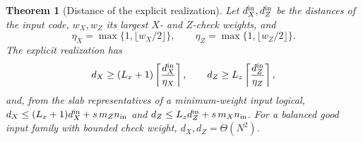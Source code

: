 \documentclass[aps,prx,reprint,superscriptaddress,nofootinbib,floatfix,longbibliography]{revtex4-2}
\newtheorem{theorem}{Theorem}[section]
\theoremstyle{definition}
\begin{document}
\begin{theorem}[Distance of the explicit realization]
\label{thm:explicit-distance}
Let $d_X^{\rm in},d_Z^{\rm in}$ be the distances of the input code,
$w_X,w_Z$ its largest $X$- and $Z$-check weights, and
\begin{equation}
 \eta_X=\max\{1,\lfloor w_X/2\rfloor\},\qquad
 \eta_Z=\max\{1,\lfloor w_Z/2\rfloor\}.
 \label{eq:eta}
\end{equation}
The explicit realization has
\begin{equation}
 d_X\ge(L_x+1)\left\lceil\frac{d_X^{\rm in}}{\eta_X}\right\rceil,\qquad
 d_Z\ge L_z\left\lceil\frac{d_Z^{\rm in}}{\eta_Z}\right\rceil,
 \label{eq:explicit-distance}
\end{equation}
and, from the slab representatives of a minimum-weight input logical,
$d_X\le(L_x+1)d_X^{\rm in}+s\,m_Zn_{\rm in}$ and
$d_Z\le L_zd_Z^{\rm in}+s\,m_Xn_{\rm in}$.
For a balanced good input family with bounded check weight,
$d_X,d_Z=\Theta(N^2)$.
\end{theorem}
\end{document}
